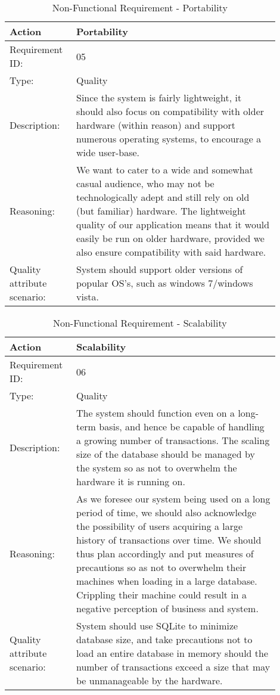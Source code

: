 \documentclass[11pt]{article}
\newcounter{use case ID}
\newcommand\addrow[2]{#1 & #2\\ \hline}
\newcounter{req ID}
\newcommand\tabularheadfsd[1]{
\begin{table}[ht]
    \addtocounter{req ID}{1}
    \caption{Non-Functional Requirement \arabic{req ID} - #1}
    \vspace{0.2cm}
    \begin{tabular}{|p{0.2\linewidth}|p{0.70\linewidth}|}
    \hline
        \textbf{Action} & \textbf{#1} \\
        \hline}
\newenvironment{requirement}{\tabularheadfsd}
{\hline\end{tabular}\end{table}}
\begin{document}
\begin{requirement}{Portability}
    \addrow{Requirement ID:}{05}
    \addrow{Type:}{Quality}
    \addrow{Description:}{Since the system is fairly lightweight, it should also focus on compatibility with older hardware (within reason) and support numerous operating systems, to encourage a wide user-base.}
    \addrow{Reasoning:}{We want to cater to a wide and somewhat casual audience, who may not be technologically adept and still rely on old (but familiar) hardware. The lightweight quality of our application means that it would easily be run on older hardware, provided we also ensure compatibility with said hardware.}
    \addrow{Quality attribute scenario:}{System should support older versions of popular OS's, such as windows 7/windows vista.}
\end{requirement}

\begin{requirement}{Scalability}
    \addrow{Requirement ID:}{06}
    \addrow{Type:}{Quality}
    \addrow{Description:}{The system should function even on a long-term basis, and hence be capable of handling a growing number of transactions. The scaling size of the database should be managed by the system so as not to overwhelm the hardware it is running on.}
    \addrow{Reasoning:}{As we foresee our system being used on a long period of time, we should also acknowledge the possibility of users acquiring a large history of transactions over time. We should thus plan accordingly and put measures of precautions so as not to overwhelm their machines when loading in a large database. Crippling their machine could result in a negative perception of business and system.}
    \addrow{Quality attribute scenario:}{System should use SQLite to minimize database size, and take precautions not to load an entire database in memory should the number of transactions exceed a size that may be unmanageable by the hardware.}
\end{requirement}
\end{document}
